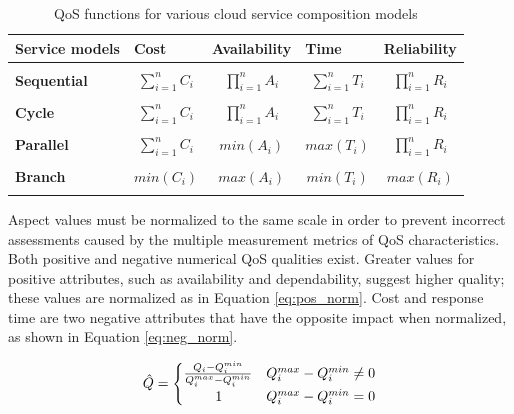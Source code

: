 \documentclass[3p,twocolumn]{elsarticle}
\theoremstyle{thmstyleone}%
\theoremstyle{thmstyletwo}%
\theoremstyle{thmstylethree}%
\begin{document}
\begin{table}[htbp!]
	\caption{QoS functions for various cloud service composition models}
	\label{tab:QOS}
	\centering
	
	\begin{tabular}{@{}lllll@{}}
		\toprule
		\textbf{Service models} & \textbf{Cost} & \textbf{Availability} & \textbf{Time} & \textbf{Reliability} \\ \midrule \\
		\textbf{Sequential}     &   \multicolumn{1}{c}{$\sum_{i=1}^{n} C_i$}    &       \multicolumn{1}{c}{$\prod_{i=1}^{n} A_i$}   &     \multicolumn{1}{c}{$\sum_{i=1}^{n} T_i$}  &       \multicolumn{1}{c}{$\prod_{i=1}^{n} R_i$}    \\\\
		\textbf{Cycle}          &   \multicolumn{1}{c}{$\sum_{i=1}^{n} C_i$}    &       \multicolumn{1}{c}{$\prod_{i=1}^{n} A_i$}   &     \multicolumn{1}{c}{$\sum_{i=1}^{n} T_i$}  &       \multicolumn{1}{c}{$\prod_{i=1}^{n} R_i$}    \\\\
		\textbf{Parallel}       &   \multicolumn{1}{c}{$\sum_{i=1}^{n} C_i$}    &       \multicolumn{1}{c}{$min(A_i)$}              &     \multicolumn{1}{c}{$max(T_i)$}            &       \multicolumn{1}{c}{$\prod_{i=1}^{n} R_i$}     \\\\
		\textbf{Branch}         &   \multicolumn{1}{c}{$min(C_i)$}              &       \multicolumn{1}{c}{$max(A_i)$}              &     \multicolumn{1}{c}{$min(T_i)$}            &       \multicolumn{1}{c}{$max(R_i)$}               \\\\ \bottomrule
	\end{tabular}
\end{table}

Aspect values must be normalized to the same scale in order to prevent incorrect assessments caused by the multiple measurement metrics of QoS characteristics. Both positive and negative numerical QoS qualities exist. Greater values for positive attributes, such as availability and dependability, suggest higher quality; these values are normalized as in Equation \ref{eq:pos_norm}. Cost and response time are two negative attributes that have the opposite impact when normalized, as shown in Equation \ref{eq:neg_norm}.

\begin{equation}
\hat{Q}=
\begin{cases}
\frac{Q_i-Q_i^{min}}{Q_i^{max}-Q_i^{min}} & Q_i^{max}-Q_i^{min} \neq 0\\    
\hspace{0.8cm}1 &    Q_i^{max}-Q_i^{min} = 0
\end{cases}
\label{eq:pos_norm}
\end{equation}
\end{document}
